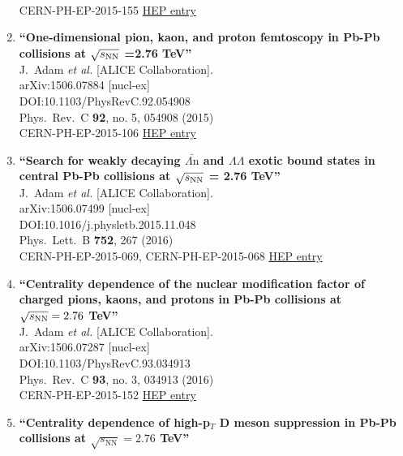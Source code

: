 \begin{enumerate}
  \\{}CERN-PH-EP-2015-155
\href{http://inspirehep.net/record/1379977}{HEP entry}
\item%
{\bf ``One-dimensional pion, kaon, and proton femtoscopy in Pb-Pb collisions at $\sqrt{s_{\rm {NN}}}$ =2.76 TeV''}
  \\{}J.~Adam {\it et al.} [ALICE Collaboration].
  \\{}arXiv:1506.07884 [nucl-ex]
  \\{}DOI:10.1103/PhysRevC.92.054908
  \\{}Phys.\ Rev.\ C {\bf 92}, no. 5, 054908 (2015)
  \\{}CERN-PH-EP-2015-106
\href{http://inspirehep.net/record/1379971}{HEP entry}
\item%
{\bf ``Search for weakly decaying $\bar{\Lambda\mathrm{n}}$ and $\Lambda\Lambda $ exotic bound states in central Pb-Pb collisions at $\sqrt{s_{\rm NN}}$ = 2.76 TeV''}
  \\{}J.~Adam {\it et al.} [ALICE Collaboration].
  \\{}arXiv:1506.07499 [nucl-ex]
  \\{}DOI:10.1016/j.physletb.2015.11.048
  \\{}Phys.\ Lett.\ B {\bf 752}, 267 (2016)
  \\{}CERN-PH-EP-2015-069, CERN-PH-EP-2015-068
\href{http://inspirehep.net/record/1377753}{HEP entry}
\item%
{\bf ``Centrality dependence of the nuclear modification factor of charged pions, kaons, and protons in Pb-Pb collisions at $\sqrt{s_{\rm NN}}=2.76$ TeV''}
  \\{}J.~Adam {\it et al.} [ALICE Collaboration].
  \\{}arXiv:1506.07287 [nucl-ex]
  \\{}DOI:10.1103/PhysRevC.93.034913
  \\{}Phys.\ Rev.\ C {\bf 93}, no. 3, 034913 (2016)
  \\{}CERN-PH-EP-2015-152
\href{http://inspirehep.net/record/1377750}{HEP entry}
\item%
{\bf ``Centrality dependence of high-p$_{T}$ D meson suppression in Pb-Pb collisions at $ \sqrt{s_{\mathrm{N}\mathrm{N}}}=2.76 $ TeV''}

\end{enumerate}
